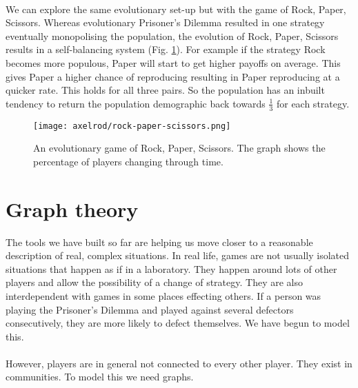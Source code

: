 \\
We can explore the same evolutionary set-up but with the game of Rock, Paper, Scissors. Whereas evolutionary Prisoner's Dilemma resulted in one strategy eventually monopolising the population, the evolution of Rock, Paper, Scissors results in a self-balancing system (Fig. \ref{rock-paper-scissors-evo}). For example if the strategy Rock becomes more populous, Paper will start to get higher payoffs on average. This gives Paper a higher chance of reproducing resulting in Paper reproducing at a quicker rate. This holds for all three pairs. So the population has an inbuilt tendency to return the population demographic back towards $\frac{1}{3}$ for each strategy.\label{mmd}
\begin{figure}
	\centering
	\texttt{[image: axelrod/rock-paper-scissors.png]}
	\caption{An evolutionary game of Rock, Paper, Scissors. The graph shows the percentage of players changing through time.}
	\label{rock-paper-scissors-evo}
\end{figure}
\section{Graph theory}\label{sec:graph-theory}
The tools we have built so far are helping us move closer to a reasonable description of real, complex situations. In real life, games are not usually isolated situations that happen as if in a laboratory. They happen around lots of other players and allow the possibility of a change of strategy. They are also interdependent with games in some places effecting others. If a person was playing the Prisoner's Dilemma and played against several defectors consecutively, they are more likely to defect themselves. We have begun to model this.\\
\\
However, players are in general not connected to every other player. They exist in communities. To model this we need graphs.\\
\\
